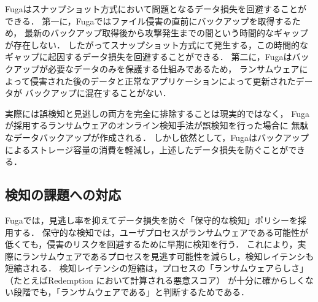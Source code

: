 Fugaはスナップショット方式において問題となるデータ損失を回避することができる．
第一に，Fugaではファイル侵害の直前にバックアップを取得するため，
最新のバックアップ取得後から攻撃発生までの間という時間的なギャップが存在しない．
したがってスナップショット方式にて発生する，この時間的なギャップに起因するデータ損失を回避することができる．
第二に，Fugaはバックアップが必要なデータのみを保護する仕組みであるため，
ランサムウェアによって侵害された後のデータと正常なアプリケーションによって更新されたデータが
バックアップに混在することがない．

実際には誤検知と見逃しの両方を完全に排除することは現実的ではなく，
Fugaが採用するランサムウェアのオンライン検知手法が誤検知を行った場合に
無駄なデータバックアップが作成される．
しかし依然として，Fugaはバックアップによるストレージ容量の消費を軽減し，上述したデータ損失を防ぐことができる．

\subsection{検知の課題への対応}
Fugaでは，見逃し率を抑えてデータ損失を防ぐ「保守的な検知」ポリシーを採用する．
保守的な検知では，ユーザプロセスがランサムウェアである可能性が低くても，侵害のリスクを回避するために早期に検知を行う．
これにより，実際にランサムウェアであるプロセスを見逃す可能性を減らし，検知レイテンシも短縮される．
検知レイテンシの短縮は，プロセスの「ランサムウェアらしさ」（たとえばRedemption \cite{kharraz2017redemption}において計算される悪意スコア）
が十分に確からしくない段階でも，「ランサムウェアである」と判断するためである．

